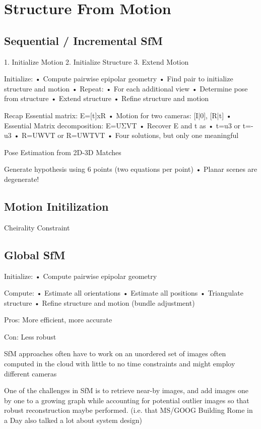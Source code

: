 \section{Structure From Motion}
\subsection{Sequential / Incremental SfM}

1. Initialize Motion
2. Initialize Structure
3. Extend Motion

 Initialize:
• Compute pairwise epipolar geometry
• Find pair to initialize structure and motion
• Repeat:
• For each additional view
• Determine pose from structure 
• Extend structure
• Refine structure and motion


Recap Essential matrix: 
E=[t]xR
• Motion for two cameras: [I|0], [R|t]
• Essential Matrix decomposition: E=UΣVT
• Recover E and t as
	• t=u3 or t=-u3
	• R=UWVT or R=UWTVT
• Four solutions, but only one meaningful

Pose Estimation from 2D-3D Matches

Generate hypothesis using 6 points
(two equations per point)
• Planar scenes are degenerate!


\subsection{Motion Initilization}
Cheirality Constraint


\subsection{Global SfM}

Initialize:
• Compute pairwise epipolar geometry

Compute:
• Estimate all orientations
• Estimate all positions
• Triangulate structure
• Refine structure and motion (bundle adjustment)

Pros: More efficient, more accurate 

Con: Less robust

SfM approaches often have to work on an unordered set of images often computed in the cloud with little to no time constraints and might employ different cameras

One of the challenges in SfM is to retrieve near-by images, and add images one by one to a growing graph while accounting for potential outlier images so that robust reconstruction maybe performed. (i.e. that MS/GOOG Building  Rome in a Day also talked a lot about system design)

